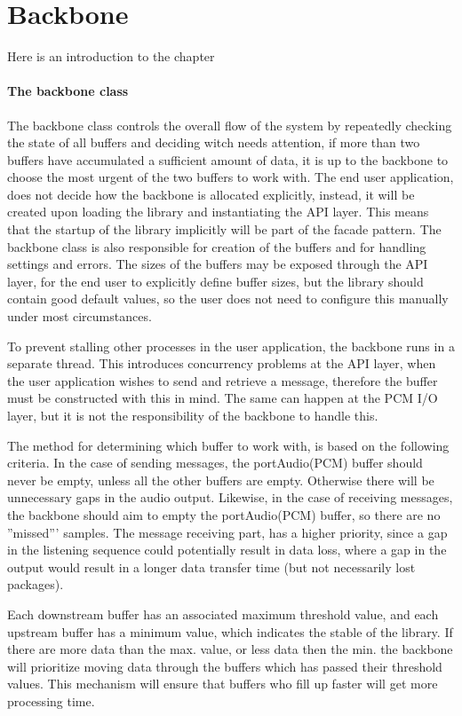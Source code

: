 \chapter{Backbone}
Here is an introduction to the chapter
\subsubsection{The backbone class}
The backbone class controls the overall flow of the system by repeatedly checking the state of all buffers and deciding witch needs attention, if more than two buffers have accumulated a sufficient amount of data, it is up to the backbone to choose the most urgent of the two buffers to work with.
The end user application, does not decide how the backbone is allocated explicitly, instead, it will be created upon loading the library and instantiating the API layer. This means that the startup of the library implicitly will be part of the facade pattern.
The backbone class is also responsible for creation of the buffers and for handling settings and errors. The sizes of the buffers may be exposed through the API layer, for the end user to explicitly define buffer sizes, but the library should contain good default values, so the user does not need to configure this manually under most circumstances.

To prevent stalling other processes in the user application, the backbone runs in a separate thread. This introduces concurrency problems at the API layer, when the user application wishes to send and retrieve a message, therefore the buffer must be constructed with this in mind.
The same can happen at the PCM I/O layer, but it is not the responsibility of the backbone to handle this.

The method for determining which buffer to work with, is based on the following criteria.
In the case of sending messages, the portAudio(PCM) buffer should never be empty, unless all the other buffers are empty. Otherwise there will be unnecessary gaps in the audio output.
Likewise, in the case of receiving messages, the backbone should aim to empty the portAudio(PCM) buffer, so there are no ''missed''' samples.
The message receiving part, has a higher priority, since a gap in the listening sequence could potentially result in data loss, where a gap in the output would result in a longer data transfer time (but not necessarily lost packages).

Each downstream buffer has an associated maximum threshold value, and each upstream buffer has a minimum value, which indicates the stable of the library. If there are more data than the max. value, or less data then the min. the backbone will prioritize moving data through the buffers which has passed their threshold values. This mechanism will ensure that buffers who fill up faster will get more processing time.

